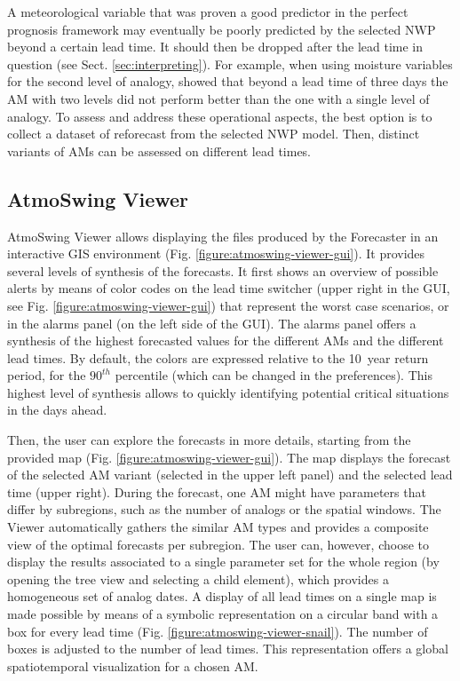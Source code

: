 \documentclass[review]{elsarticle}
\begin{document}
A meteorological variable that was proven a good predictor in the perfect prognosis framework may eventually be poorly predicted by the selected NWP beyond a certain lead time. It should then be dropped after the lead time in question (see Sect. \ref{sec:interpreting}). For example, when using moisture variables for the second level of analogy, \citet{Thevenot2004} showed that beyond a lead time of three days the AM with two levels did not perform better than the one with a single level of analogy. To assess and address these operational aspects, the best option is to collect a dataset of reforecast from the selected NWP model. Then, distinct variants of AMs can be assessed on different lead times. 


\subsection{AtmoSwing Viewer}
\label{sec:viewer}

AtmoSwing Viewer allows displaying the files produced by the Forecaster in an interactive GIS environment (Fig. \ref{figure:atmoswing-viewer-gui}). It provides several levels of synthesis of the forecasts. It first shows an overview of possible alerts by means of color codes on the lead time switcher (upper right in the GUI, see Fig. \ref{figure:atmoswing-viewer-gui}) that represent the worst case scenarios, or in the alarms panel (on the left side of the GUI). The alarms panel offers a synthesis of the highest forecasted values for the different AMs and the different lead times. By default, the colors are expressed relative to the 10~year return period, for the $90^{th}$ percentile (which can be changed in the preferences). This highest level of synthesis allows to quickly identifying potential critical situations in the days ahead.

Then, the user can explore the forecasts in more details, starting from the provided map (Fig. \ref{figure:atmoswing-viewer-gui}). The map displays the forecast of the selected AM variant (selected in the upper left panel) and the selected lead time (upper right). During the forecast, one AM might have parameters that differ by subregions, such as the number of analogs or the spatial windows. The Viewer automatically gathers the similar AM types and provides a composite view of the optimal forecasts per subregion. The user can, however, choose to display the results associated to a single parameter set for the whole region (by opening the tree view and selecting a child element), which provides a homogeneous set of analog dates. A display of all lead times on a single map is made possible by means of a symbolic representation on a circular band with a box for every lead time (Fig. \ref{figure:atmoswing-viewer-snail}). The number of boxes is adjusted to the number of lead times. This representation offers a global spatiotemporal visualization for a chosen AM.
\end{document}
